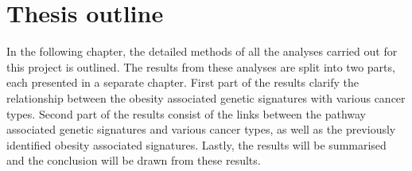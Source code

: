 \section{Thesis outline}
\label{sec:thesis_outline}

In the following chapter, the detailed methods of all the analyses carried out for this project is outlined.
The results from these analyses are split into two parts, each presented in a separate chapter.
First part of the results clarify the relationship between the obesity associated genetic signatures with various cancer types.
Second part of the results consist of the links between the pathway associated genetic signatures and various cancer types, as well as the previously identified obesity associated signatures.
Lastly, the results will be summarised and the conclusion will be drawn from these results.
